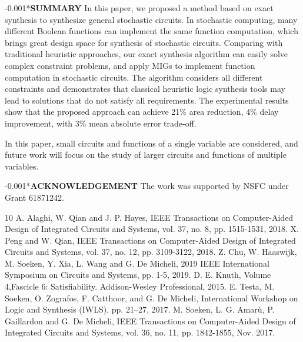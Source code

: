 \documentclass[conference,letterpaper]{IEEEtran}
\makeatletter
\renewcommand{\section}{\@startsection{section}{1}{0mm}
    {-\baselineskip}{0.001\baselineskip}{\bf\leftline}}
\makeatother
\begin{document}
\section*{\textbf{\large SUMMARY}}
In this paper, we proposed a method based on  exact synthesis to synthesize general stochastic circuits. In stochastic computing, many different Boolean functions can implement the same function computation, which brings great design space for synthesis of stochastic circuits. Comparing with traditional heuristic approaches, our exact synthesis algorithm can easily solve complex constraint problems, and apply MIGs to implement function computation in stochastic circuits. The algorithm considers all different constraints and demonstrates that classical heuristic logic synthesis tools may lead to solutions that do not satisfy all requirements. The experimental results show that the proposed approach can achieve 21\% area reduction, 4\% delay improvement, with 3\% mean absolute error trade-off.

In this paper, small circuits and functions of a single variable are considered, and future work will focus on the study of larger circuits and functions of multiple variables.

\section*{\textbf{\large ACKNOWLEDGEMENT}} \vspace{-0ex}
The work was supported by NSFC under Grant 61871242.

\small
\begin{thebibliography}{10}
A. Alaghi, W. Qian and J. P. Hayes, IEEE Transactions on Computer-Aided Design of Integrated Circuits and Systems, vol. 37, no. 8, pp. 1515-1531, 2018.
X. Peng and W. Qian, IEEE Transactions on Computer-Aided Design of Integrated Circuits and Systems, vol. 37, no. 12, pp. 3109-3122, 2018.
Z. Chu, W. Haaswijk, M. Soeken, Y. Xia, L. Wang and G. De Micheli, 2019 IEEE International Symposium on Circuits and Systems, pp. 1-5,  2019.
D. E. Knuth, Volume 4,Fascicle 6: Satisfiability. Addison-Wesley Professional, 2015.
E. Testa, M. Soeken, O. Zografos, F. Catthoor, and G. De Micheli,  International Workshop on Logic and Synthesis (IWLS), pp. 21–27, 2017.
M. Soeken, L. G. Amarù, P. Gaillardon and G. De Micheli, IEEE Transactions on Computer-Aided Design of Integrated Circuits and Systems, vol. 36, no. 11, pp. 1842-1855, Nov. 2017.
\end{thebibliography}

%
\end{document}
